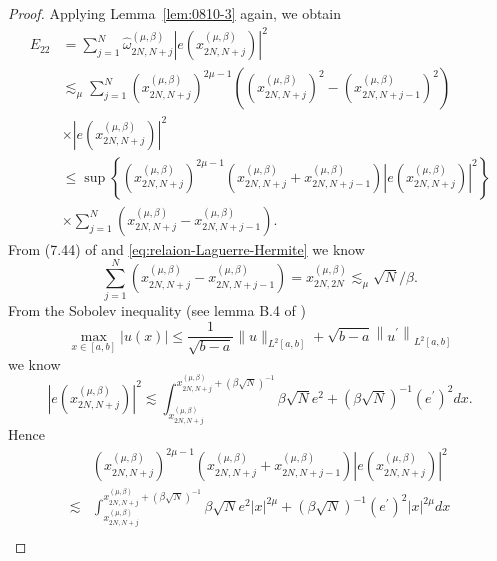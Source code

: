 \documentclass[pdflatex,sn-aps]{sn-jnl}%
\theoremstyle{thmstyleone}%
\theoremstyle{thmstyletwo}%
\theoremstyle{thmstylethree}%
\begin{document}
\begin{appendices}
\begin{proof}
  Applying Lemma~\ref{lem:0810-3} again, we obtain
  \begin{equation}\label{eq:0810-17}
    \begin{aligned}
    E_{22} & = \sum_{j=1}^N \widehat{\omega}_{2 N, N+j}^{(\mu, \beta)}\left|e\left(x_{2N,N+j}^{(\mu,\beta)}\right)\right|^2 \\
    & \lesssim_\mu \sum_{j=1}^N \left(x_{2N,N+j}^{(\mu,\beta)}\right)^{2 \mu-1}\left(\left(x_{2N,N+j}^{(\mu,\beta)}\right)^2-\left(x_{2N,N+j-1}^{(\mu,\beta)}\right)^2\right) \\
    & \times \left|e\left(x_{2N,N+j}^{(\mu,\beta)}\right)\right|^2 \\
    & \leqslant\sup \left\{\left(x_{2N,N+j}^{(\mu,\beta)}\right)^{2 \mu-1}\left(x_{2N,N+j}^{(\mu,\beta)}+x_{2N,N+j-1}^{(\mu,\beta)}\right)\left|e\left(x_{2N,N+j}^{(\mu,\beta)}\right)\right|^2\right\} \\
    & \times \sum_{j=1}^N\left(x_{2N,N+j}^{(\mu,\beta)}-x_{2N,N+j-1}^{(\mu,\beta)}\right).
    \end{aligned}
  \end{equation}
  From (7.44) of \cite{shen2011spectral} and \eqref{eq:relaion-Laguerre-Hermite} we know
  \begin{equation}\label{eq:0810-18}
    \sum_{j=1}^N\left(x_{2N,N+j}^{(\mu,\beta)}-x_{2N,N+j-1}^{(\mu,\beta)}\right)=x_{2N,2N}^{(\mu,\beta)} \lesssim_\mu \sqrt{N}/\beta.
  \end{equation}
  From the Sobolev inequality (see lemma B.4 of \cite{shen2011spectral})
  \begin{equation}\label{eq:0810-19}
    \max _{x \in[a, b]}|u(x)| \leqslant \frac{1}{\sqrt{b-a}}\|u\|_{L^2[a, b]}+\sqrt{b-a}\left\|u^{\prime}\right\|_{L^2[a, b]}
  \end{equation}
  we know
  \begin{equation}\label{eq:0810-20}
    \left|e\left(x_{2N,N+j}^{(\mu,\beta)}\right)\right|^2 \lesssim \int_{x_{2N,N+j}^{(\mu,\beta)}}^{x_{2N,N+j}^{(\mu,\beta)}+\left(\beta\sqrt{N}\right)^{-1}} \beta\sqrt{N} e^2 + \left(\beta\sqrt{N}\right)^{-1} \left(e^{\prime}\right)^2 d x.
  \end{equation}
  Hence
  \begin{equation}\label{eq:0810-21}
    \begin{aligned}
      & \left(x_{2N,N+j}^{(\mu,\beta)}\right)^{2 \mu-1}\left(x_{2N,N+j}^{(\mu,\beta)}+x_{2N,N+j-1}^{(\mu,\beta)}\right)\left|e\left(x_{2N,N+j}^{(\mu,\beta)}\right)\right|^2 \\
      \lesssim & \int_{x_{2N,N+j}^{(\mu,\beta)}}^{x_{2N,N+j}^{(\mu,\beta)}+\left(\beta\sqrt{N}\right)^{-1}} \beta\sqrt{N} e^2 |x|^{2\mu} + \left(\beta\sqrt{N}\right)^{-1} \left(e^{\prime}\right)^2 |x|^{2\mu} d x \\

\end{aligned}
\end{equation}
\end{proof}
\end{appendices}
\end{document}

